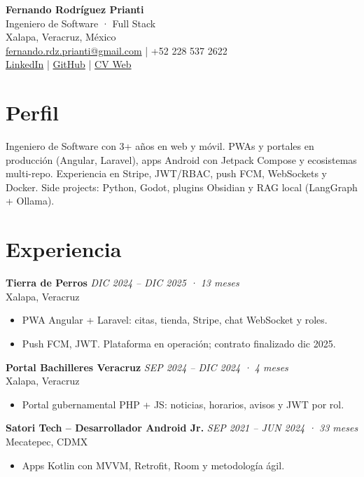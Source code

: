 \documentclass[letterpaper,10pt]{article}
\begin{document}
\begin{center}
    {\Large \textbf{Fernando Rodríguez Prianti}}\\[0.1cm]
    {\large Ingeniero de Software · Full Stack}\\[0.15cm]
    Xalapa, Veracruz, México \\
    \href{mailto:fernando.rdz.prianti@gmail.com}{fernando.rdz.prianti@gmail.com} \quad | \quad +52 228 537 2622 \\
    \href{https://www.linkedin.com/in/fernando-rodr{\'i}guez-732670140/}{LinkedIn} \quad | \quad
    \href{https://github.com/FernandoRP-nan}{GitHub} \quad | \quad
    \href{https://fernandorp-nan.github.io/fernando-cv/}{CV Web}
\end{center}

\section*{Perfil}
Ingeniero de Software con 3+ años en web y móvil. PWAs y portales en producción (Angular, Laravel), apps Android con Jetpack Compose y ecosistemas multi-repo. Experiencia en Stripe, JWT/RBAC, push FCM, WebSockets y Docker. Side projects: Python, Godot, plugins Obsidian y RAG local (LangGraph + Ollama).

\section*{Experiencia}
\textbf{Tierra de Perros} \hfill \textit{DIC 2024 -- DIC 2025 · 13 meses}\\
Xalapa, Veracruz
\begin{itemize}
    \item PWA Angular + Laravel: citas, tienda, Stripe, chat WebSocket y roles.
    \item Push FCM, JWT. Plataforma en operación; contrato finalizado dic 2025.
\end{itemize}

\textbf{Portal Bachilleres Veracruz} \hfill \textit{SEP 2024 -- DIC 2024 · 4 meses}\\
Xalapa, Veracruz
\begin{itemize}
    \item Portal gubernamental PHP + JS: noticias, horarios, avisos y JWT por rol.
\end{itemize}

\textbf{Satori Tech -- Desarrollador Android Jr.} \hfill \textit{SEP 2021 -- JUN 2024 · 33 meses}\\
Mecatepec, CDMX
\begin{itemize}
    \item Apps Kotlin con MVVM, Retrofit, Room y metodología ágil.
\end{itemize}
\end{document}
